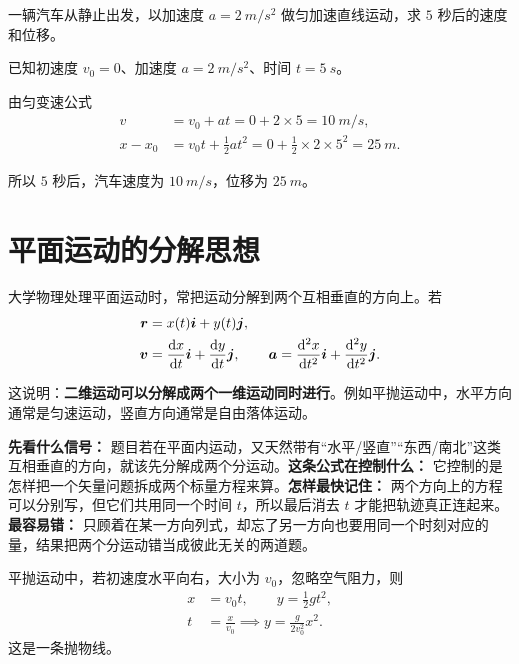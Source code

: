 \documentclass[lang=cn,11pt]{elegantbook}
\begin{document}
\begin{example}
一辆汽车从静止出发，以加速度 \(a=\SI{2}{m/s^2}\) 做匀加速直线运动，求 \(5\) 秒后的速度和位移。
\end{example}

\begin{solution}
已知初速度 \(v_0=0\)、加速度 \(a=\SI{2}{m/s^2}\)、时间 \(t=\SI{5}{s}\)。

由匀变速公式
\[
\begin{aligned}
v&=v_0+at=0+2\times 5=\SI{10}{m/s},\\
x-x_0&=v_0t+\frac{1}{2}at^2=0+\frac{1}{2}\times 2\times 5^2=\SI{25}{m}.
\end{aligned}
\]

所以 \(5\) 秒后，汽车速度为 \(\SI{10}{m/s}\)，位移为 \(\SI{25}{m}\)。
\end{solution}

\section{平面运动的分解思想}

大学物理处理平面运动时，常把运动分解到两个互相垂直的方向上。若
\[
\begin{aligned}
\vb*{r}&=x(t)\vb*{i}+y(t)\vb*{j},\\
\vb*{v}&=\dv{x}{t}\vb*{i}+\dv{y}{t}\vb*{j},\qquad
\vb*{a}=\dv[2]{x}{t}\vb*{i}+\dv[2]{y}{t}\vb*{j}.
\end{aligned}
\]

这说明：\textbf{二维运动可以分解成两个一维运动同时进行}。例如平抛运动中，水平方向通常是匀速运动，竖直方向通常是自由落体运动。

\begin{note}
\textbf{先看什么信号：} 题目若在平面内运动，又天然带有“水平/竖直”“东西/南北”这类互相垂直的方向，就该先分解成两个分运动。\textbf{这条公式在控制什么：} 它控制的是怎样把一个矢量问题拆成两个标量方程来算。\textbf{怎样最快记住：} 两个方向上的方程可以分别写，但它们共用同一个时间 \(t\)，所以最后消去 \(t\) 才能把轨迹真正连起来。\textbf{最容易错：} 只顾着在某一方向列式，却忘了另一方向也要用同一个时刻对应的量，结果把两个分运动错当成彼此无关的两道题。
\end{note}

\begin{example}
平抛运动中，若初速度水平向右，大小为 \(v_0\)，忽略空气阻力，则
\[
\begin{aligned}
x&=v_0t,\qquad y=\frac{1}{2}gt^2,\\
t&=\frac{x}{v_0}\implies y=\frac{g}{2v_0^2}x^2.
\end{aligned}
\]
这是一条抛物线。
\end{example}
\end{document}
